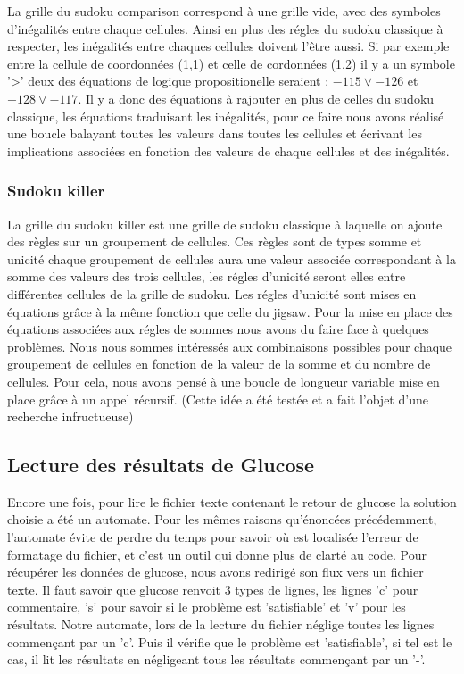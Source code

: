 \documentclass[a4paper,8pt,french,fleqn]{article}
\begin{document}
La grille du sudoku comparison correspond à une grille vide, avec des symboles d'inégalités entre chaque cellules. Ainsi en plus des régles du sudoku classique à respecter, les inégalités entre chaques cellules doivent l'être aussi. Si par exemple entre la cellule de coordonnées (1,1) et celle de cordonnées (1,2) il y a un symbole '>' deux des équations de logique propositionelle seraient : $ -115 \lor -126$ et $-128 \lor -117$. Il y a donc des équations à rajouter en plus de celles du sudoku classique, les équations traduisant les inégalités, pour ce faire nous avons réalisé une boucle balayant toutes les valeurs dans toutes les cellules et écrivant les implications associées en fonction des valeurs de chaque cellules et des inégalités.

\subsubsection*{Sudoku killer}

La grille du sudoku killer est une grille de sudoku classique à laquelle on ajoute des règles sur un groupement de cellules. Ces règles sont de types somme et unicité chaque groupement de cellules aura une valeur associée correspondant à la somme des valeurs des trois cellules, les régles d'unicité seront elles entre différentes cellules de la grille de sudoku. Les régles d'unicité sont mises en équations grâce à la même fonction que celle du jigsaw. Pour la mise en place des équations associées aux régles de sommes nous avons du faire face à quelques problèmes. Nous nous sommes intéressés aux combinaisons possibles pour chaque groupement de cellules en fonction de la valeur de la somme et du nombre de cellules. Pour cela, nous avons pensé à une boucle de longueur variable mise en place grâce à un appel récursif. (Cette idée a été testée et a fait l'objet d'une recherche infructueuse) 

\subsection{Lecture des résultats de Glucose}

Encore une fois, pour lire le fichier texte contenant le retour de glucose la solution choisie a été un automate. Pour les mêmes raisons qu'énoncées précédemment, l'automate évite de perdre du temps pour savoir où est localisée l'erreur de formatage du fichier, et c'est un outil qui donne plus de clarté au code. Pour récupérer les données de glucose, nous avons redirigé son flux vers un fichier texte. Il faut savoir que glucose renvoit 3 types de lignes, les lignes 'c' pour commentaire, 's' pour savoir si le problème est 'satisfiable' et 'v' pour les résultats. Notre automate, lors de la lecture du fichier néglige toutes les lignes commençant par un 'c'. Puis il vérifie que le problème est 'satisfiable', si tel est le cas, il lit les résultats en négligeant tous les résultats commençant par un '-'.
\end{document}

